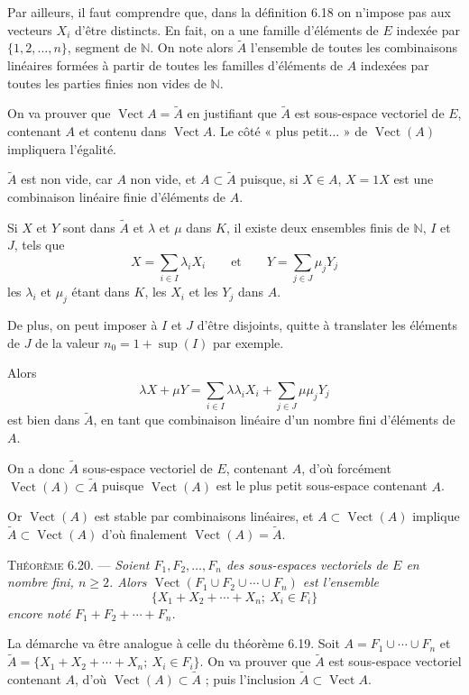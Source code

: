 Par ailleurs, il faut comprendre que, dans la définition 6.18 on n'impose pas aux vecteurs $X_i$ d'être distincts. En fait, on a une famille d'éléments de $E$ indexée par $\{1,2,\ldots,n\}$, segment de $\mathbb N$. On note alors $\widetilde A$ l'ensemble de toutes les combinaisons linéaires formées à partir de toutes les familles d'éléments de $A$ indexées par toutes les parties finies non vides de $\mathbb N$.

On va prouver que $\operatorname{Vect}A=\widetilde A$ en justifiant que $\widetilde A$ est sous-espace vectoriel de $E$, contenant $A$ et contenu dans $\operatorname{Vect}A$. Le côté « plus petit... » de $\operatorname{Vect}(A)$ impliquera l'égalité.

$\widetilde A$ est non vide, car $A$ non vide, et $A\subset\widetilde A$ puisque, si $X\in A$, $X=1X$ est une combinaison linéaire finie d'éléments de $A$.

Si $X$ et $Y$ sont dans $\widetilde A$ et $\lambda$ et $\mu$ dans $K$, il existe deux ensembles finis de $\mathbb N$, $I$ et $J$, tels que
\[
X=\sum_{i\in I}\lambda_iX_i\qquad\text{et}\qquad Y=\sum_{j\in J}\mu_jY_j
\]
les $\lambda_i$ et $\mu_j$ étant dans $K$, les $X_i$ et les $Y_j$ dans $A$.

De plus, on peut imposer à $I$ et $J$ d'être disjoints, quitte à translater les éléments de $J$ de la valeur $n_0=1+\sup(I)$ par exemple.

Alors
\[
\lambda X+\mu Y=\sum_{i\in I}\lambda\lambda_iX_i+\sum_{j\in J}\mu\mu_jY_j
\]
est bien dans $\widetilde A$, en tant que combinaison linéaire d'un nombre fini d'éléments de $A$.

On a donc $\widetilde A$ sous-espace vectoriel de $E$, contenant $A$, d'où forcément $\operatorname{Vect}(A)\subset\widetilde A$ puisque $\operatorname{Vect}(A)$ est le plus petit sous-espace contenant $A$.

Or $\operatorname{Vect}(A)$ est stable par combinaisons linéaires, et $A\subset\operatorname{Vect}(A)$ implique $\widetilde A\subset\operatorname{Vect}(A)$ d'où finalement $\operatorname{Vect}(A)=\widetilde A$. \bookend

\medskip\noindent\textsc{Théorème 6.20.} --- \emph{Soient $F_1,F_2,\ldots,F_n$ des sous-espaces vectoriels de $E$ en nombre fini, $n\ge2$. Alors $\operatorname{Vect}(F_1\cup F_2\cup\cdots\cup F_n)$ est l'ensemble
\[
\{X_1+X_2+\cdots+X_n;\ X_i\in F_i\}
\]
encore noté $F_1+F_2+\cdots+F_n$.}

La démarche va être analogue à celle du théorème 6.19. Soit $A=F_1\cup\cdots\cup F_n$ et $\widetilde A=\{X_1+X_2+\cdots+X_n;\ X_i\in F_i\}$. On va prouver que $\widetilde A$ est sous-espace vectoriel contenant $A$, d'où $\operatorname{Vect}(A)\subset\widetilde A$ ; puis l'inclusion $\widetilde A\subset\operatorname{Vect}A$.

